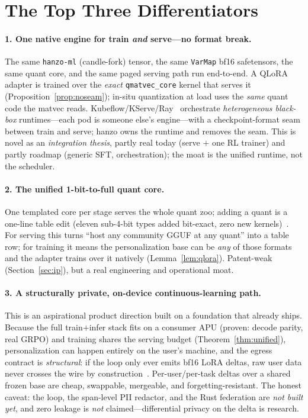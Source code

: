 \documentclass[11pt]{article}
\begin{document}
\section{The Top Three Differentiators}
\label{sec:moat}

\paragraph{1. One native engine for train \emph{and} serve---no format break.} The same \texttt{hanzo-ml} (candle-fork) tensor, the same \texttt{VarMap} bf16 safetensors, the same quant core, and the same paged serving path run end-to-end. A QLoRA adapter is trained over the \emph{exact} \texttt{qmatvec\_core} kernel that serves it (Proposition~\ref{prop:noseam}); in-situ quantization at load uses the \emph{same} quant code the matvec reads. Kubeflow/KServe/Ray~\cite{kubeflow,kserve,ray} orchestrate \emph{heterogeneous black-box} runtimes---each pod is someone else's engine---with a checkpoint-format seam between train and serve; hanzo owns the runtime and removes the seam. This is novel as an \emph{integration thesis}, partly real today (serve $+$ one RL trainer) and partly roadmap (generic SFT, orchestration); the moat is the unified runtime, not the scheduler.

\paragraph{2. The unified 1-bit-to-full quant core.} One templated core per stage serves the whole quant zoo; adding a quant is a one-line table edit (eleven sub-4-bit types added bit-exact, zero new kernels)~\cite{hanzo-rocm}. For serving this turns ``host any community GGUF at any quant'' into a table row; for training it means the personalization base can be \emph{any} of those formats and the adapter trains over it natively (Lemma~\ref{lem:qlora}). Patent-weak (Section~\ref{sec:ip}), but a real engineering and operational moat.

\paragraph{3. A structurally private, on-device continuous-learning path.} This is an aspirational product direction built on a foundation that already ships. Because the full train$+$infer stack fits on a consumer APU (proven: decode parity, real GRPO) and training shares the serving budget (Theorem~\ref{thm:unified}), personalization can happen entirely on the user's machine, and the egress contract is \emph{structural}: if the loop only ever emits bf16 LoRA deltas, raw user data never crosses the wire by construction~\cite{hanzo-clp}. Per-user/per-task deltas over a shared frozen base are cheap, swappable, mergeable, and forgetting-resistant. The honest caveat: the loop, the span-level PII redactor, and the Rust federation are \emph{not built yet}, and zero leakage is \emph{not} claimed---differential privacy on the delta is research.
\end{document}
